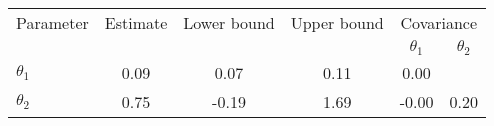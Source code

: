 \begin{tabular}{l|ccc|cc} \hline \hline 
Parameter & Estimate & Lower bound & Upper bound & \multicolumn{2}{c}{Covariance}  \\& & & & $\theta_1$ & $\theta_2$ \\ \hline 
$\theta_1$ & 0.09 & 0.07 & 0.11 & 0.00 & \\ 
$\theta_2$ & 0.75 & -0.19 & 1.69 & -0.00 & 0.20 \\ 
\hline \hline 
\end{tabular} 
